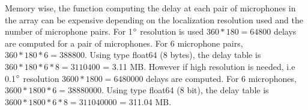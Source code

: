 Memory wise, the function computing the delay at each pair of microphones in the array can be expensive depending on the localization resolution used and the number of microphone pairs. For 1$\degree$ resolution is used $360*180=64800$ delays are computed for a pair of microphones. For 6 microphone pairs,$360*180*6=388800$.  Using type float64 (8 bytes), the delay table is  $360*180*6*8=3110400$ = 3.11 MB. However if high resolution is needed, i.e 0.1$\degree$ resolution $3600*1800=6480000$ delays are computed. For 6 microphones,$3600*1800*6=38880000$.  Using type float64 (8 bit), the delay table is  $3600*1800*6*8=311040000$ = 311.04 MB.


